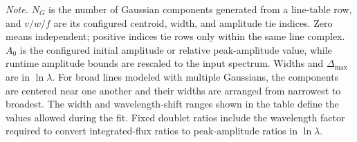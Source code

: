 \begin{table}[ht]
\begin{tabular}{p{0.20\linewidth} r c c c c}
\hline
\end{tabular}
\vspace{0.4em}
\begin{minipage}{0.96\linewidth}
\scriptsize
\textit{Note.} $N_G$ is the number of Gaussian components generated from a
line-table row, and $v/w/f$ are its configured centroid, width, and amplitude
tie indices. Zero means independent; positive indices tie rows only within the
same line complex. $A_0$ is the configured initial amplitude or relative
peak-amplitude value, while runtime amplitude bounds are rescaled to the input
spectrum. Widths and $\Delta_{\max}$ are in $\ln\lambda$. For broad lines
modeled with multiple Gaussians, the components are centered near one another
and their widths are arranged from narrowest to broadest. The width and
wavelength-shift ranges shown in the table define the values allowed during
the fit. Fixed doublet ratios include the wavelength
factor required to convert integrated-flux ratios to peak-amplitude ratios in
$\ln\lambda$.
\end{minipage}
\end{table}
